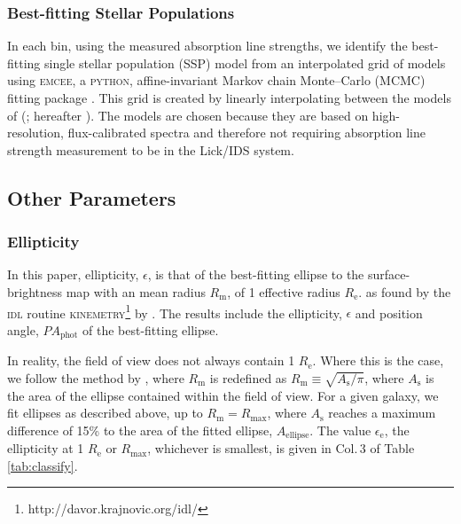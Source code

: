 \documentclass[a4paper,fleqn,usenatbib]{mnras}
\begin{document}
	\subsubsection{Best-fitting Stellar Populations}
		\label{subsubsec:stellarPop}
		In each bin, using the measured absorption line strengths, we identify the best-fitting single stellar population (SSP) model from an interpolated grid of models using \textsc{emcee}, a \textsc{python}, affine-invariant Markov chain Monte--Carlo (MCMC) fitting package \citep{Foreman-Mackey2013}. This grid is created by linearly interpolating between the models of \citeauthor{Thomas2010} (\citeyear{Thomas2010}; hereafter ). The  models are chosen because they are based on high-resolution, flux-calibrated spectra and therefore not requiring absorption line strength measurement to be in the Lick/IDS system.

	\subsection{Other Parameters}
		\subsubsection{Ellipticity}
			\label{subsubsec:ellip}
			In this paper, ellipticity, $\epsilon$, is that of the best-fitting ellipse to the surface-brightness map with an mean radius $R_\text{m}$, of 1 effective radius $R_\text{e}$. %
			as found by the \textsc{idl} routine \textsc{kinemetry}\footnote{http://davor.krajnovic.org/idl/} by \citet{Krajnovic2006}.%
			The results include the ellipticity, $\epsilon$ and position angle, $PA_\text{phot}$ of the best-fitting ellipse.%

			In reality, the field of view does not always contain 1 $R_\text{e}$. Where this is the case, we follow the method by \citet{Emsellem2007}, where $R_\text{m}$ is redefined as $R_\text{m} \equiv \sqrt{A_\text{s}/\pi}$, where $A_\text{s}$ is the area of the ellipse contained within the field of view. For a given galaxy, we fit ellipses as described above, up to $R_\text{m} = R_\text{max}$, where $A_\text{s}$ reaches a maximum difference of 15\% to the area of the fitted ellipse, $A_\text{ellipse}$. The value $\epsilon_\text{e}$, the ellipticity at 1 $R_\text{e}$ or $R_\text{max}$, whichever is smallest, is given in Col.\,3 of Table \ref{tab:classify}. 
\end{document}
